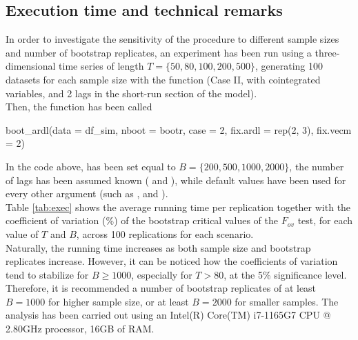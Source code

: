 \subsection{Execution time and technical remarks}
In order to investigate the sensitivity of the procedure to different sample sizes and number of bootstrap replicates, an experiment has been run using a three-dimensional time series of length $T=\{50,80,100,200,500\}$, generating 100 datasets for each sample size with the  function (Case II, with cointegrated variables, and 2 lags in the short-run section of the model).\\ Then, the  function has been called

\begin{example}
boot_ardl(data = df_sim,
          nboot = bootr,
          case = 2,
          fix.ardl = rep(2, 3),
          fix.vecm = 2)
\end{example}

\noindent In the code above,  has been set equal to $B=\{200,500,1000,2000\}$, the number of lags has been assumed known ( and ), while default values have been used for every other argument (such as ,  and ).\\
Table \ref{tab:exec} shows the average running time per replication together with  the coefficient of variation (\%) of the bootstrap critical values of the $F_{ov}$ test, for each value of $T$ and $B$, across 100 replications for each scenario.\\
Naturally, the running time increases as both sample size and bootstrap replicates increase. However, it can be noticed how the coefficients of variation tend to stabilize for $B \geq 1000$, especially for $T>80$, at the 5\% significance level. Therefore, it is recommended a number of bootstrap replicates of at least $B=1000$ for higher sample size, or at least $B=2000$ for smaller samples. The analysis has been carried out using an Intel(R) Core(TM) i7-1165G7 CPU @ 2.80GHz processor, 16GB of RAM.

